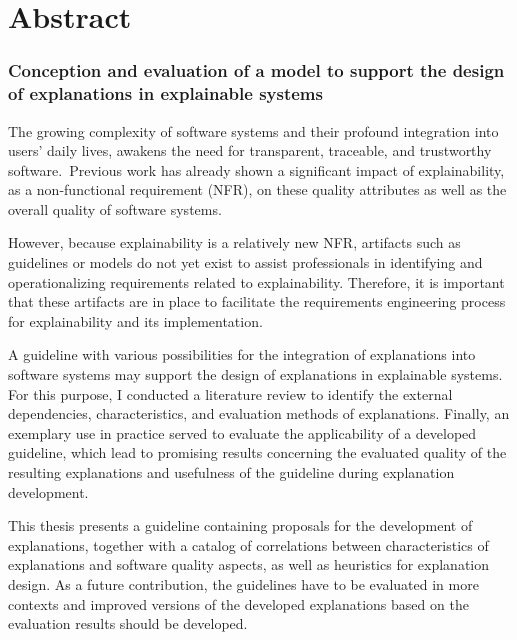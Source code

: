 \clearpage

\chapter*{Abstract}

\subsection*{Conception and evaluation of a model to support the design of explanations in explainable systems}

The growing complexity of software systems and their profound integration into users’ daily lives, awakens the need for transparent, traceable, and trustworthy software. Previous work  has already shown a significant impact of explainability, as a non-functional requirement (NFR), on these quality attributes as well as the overall quality of software systems.

However, because explainability is a relatively new NFR, artifacts such as guidelines or models do not yet exist to assist professionals in identifying and operationalizing requirements related to explainability. Therefore, it is important that these artifacts are in place to facilitate the requirements engineering process for explainability and its implementation.

A guideline with various possibilities for the integration of explanations into software systems may support the design of explanations in explainable systems. For this purpose, I conducted a literature review to identify the external dependencies, characteristics, and evaluation methods of explanations. Finally, an exemplary use in practice served to evaluate the applicability of a developed guideline, which lead to promising results concerning the evaluated quality of the resulting explanations and usefulness of the guideline during explanation development.

This thesis presents a guideline containing proposals for the development of explanations, together with a catalog of correlations between characteristics of explanations and software quality aspects, as well as heuristics for explanation design. As a future contribution, the guidelines have to be evaluated in more contexts and improved versions of the developed explanations based on the evaluation results should be developed.

\clearpage